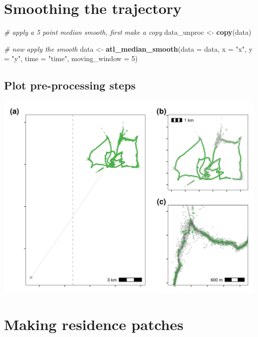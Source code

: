 \documentclass[
]{scrreprt}
\newenvironment{Shaded}{}{}
\newcommand{\CommentTok}[1]{\textcolor[rgb]{0.38,0.63,0.69}{\textit{#1}}}
\newcommand{\DataTypeTok}[1]{\textcolor[rgb]{0.56,0.13,0.00}{#1}}
\newcommand{\DecValTok}[1]{\textcolor[rgb]{0.25,0.63,0.44}{#1}}
\newcommand{\KeywordTok}[1]{\textcolor[rgb]{0.00,0.44,0.13}{\textbf{#1}}}
\newcommand{\NormalTok}[1]{#1}
\newcommand{\StringTok}[1]{\textcolor[rgb]{0.25,0.44,0.63}{#1}}
\begin{document}
\hypertarget{smoothing-the-trajectory}{%
\section{Smoothing the trajectory}\label{smoothing-the-trajectory}}

\begin{Shaded}
\begin{Highlighting}[]
\CommentTok{\# apply a 5 point median smooth, first make a copy}
\NormalTok{data\_unproc <{-}}\StringTok{ }\KeywordTok{copy}\NormalTok{(data)}

\CommentTok{\# now apply the smooth}
\NormalTok{data <{-}}\StringTok{ }\KeywordTok{atl\_median\_smooth}\NormalTok{(}\DataTypeTok{data =}\NormalTok{ data,}
                          \DataTypeTok{x =} \StringTok{"x"}\NormalTok{, }\DataTypeTok{y =} \StringTok{"y"}\NormalTok{, }\DataTypeTok{time =} \StringTok{"time"}\NormalTok{,}
                          \DataTypeTok{moving\_window =} \DecValTok{5}\NormalTok{)}
\end{Highlighting}
\end{Shaded}

\hypertarget{plot-pre-processing-steps}{%
\subsection{Plot pre-processing steps}\label{plot-pre-processing-steps}}

\includegraphics{figures/fig_walkthrough.png}

\hypertarget{making-residence-patches}{%
\section{Making residence patches}\label{making-residence-patches}}
\end{document}
